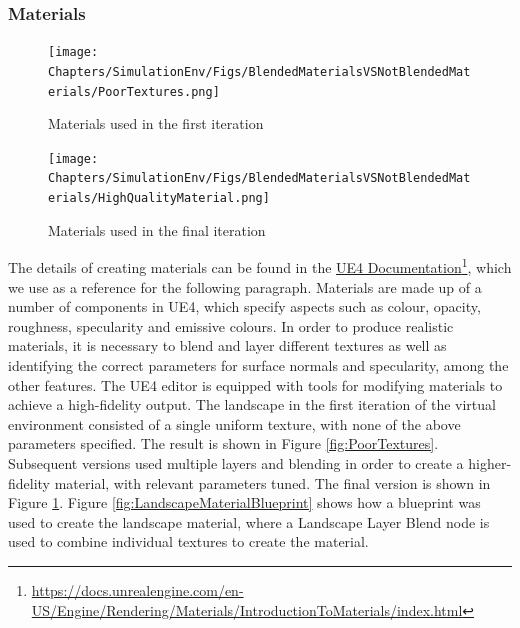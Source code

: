 \subsubsection{Materials}


\begin{figure}
    \centering
    \texttt{[image: Chapters/SimulationEnv/Figs/BlendedMaterialsVSNotBlendedMaterials/PoorTextures.png]}
    \caption{Materials used in the first iteration}
    \label{fig:PoorTextures}
    \texttt{[image: Chapters/SimulationEnv/Figs/BlendedMaterialsVSNotBlendedMaterials/HighQualityMaterial.png]}
    \caption{Materials used in the final iteration}
    \label{fig:GoodTextures}
\end{figure}

The details of creating materials can be found in the 
\href{https://docs.unrealengine.com/en-US/Engine/Rendering/Materials/IntroductionToMaterials/index.html}{UE4 Documentation}\footnote{\href {https://docs.unrealengine.com/en-US/Engine/Rendering/Materials/IntroductionToMaterials/index.html}{https://docs.unrealengine.com/en-US/Engine/Rendering/Materials/IntroductionToMaterials/index.html}}, which we use as a reference for the following paragraph.
Materials are made up of a number of components in UE4, which specify aspects such as colour, opacity, roughness, specularity and emissive colours. In order to produce realistic materials, it is necessary to blend and layer different textures as well as identifying the correct parameters for surface normals and specularity, among the other features. The UE4 editor is equipped with tools for modifying materials to achieve a high-fidelity output. The landscape in the first iteration of the virtual environment consisted of a single uniform texture, with none of the above parameters specified. The result is shown in Figure \ref{fig:PoorTextures}. Subsequent versions used multiple layers and blending in order to create a higher-fidelity material, with relevant parameters tuned. The final version is shown in Figure \ref{fig:GoodTextures}. Figure \ref{fig:LandscapeMaterialBlueprint} shows how a blueprint was used to create the landscape material, where a Landscape Layer Blend node is used to combine individual textures to create the material.

